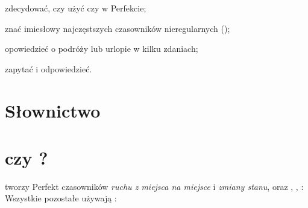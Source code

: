 \begin{candos}
\item zdecydować, czy użyć  czy  w Perfekcie;
\item znać imiesłowy najczęstszych czasowników nieregularnych ();
\item opowiedzieć o podróży lub urlopie w kilku zdaniach;
\item zapytać  i odpowiedzieć.
\end{candos}

\section{Słownictwo}

\section{ czy ?}
 tworzy Perfekt czasowników \emph{ruchu z miejsca na miejsce} i \emph{zmiany stanu}, oraz , ,
:    
Wszystkie pozostałe używają :  

